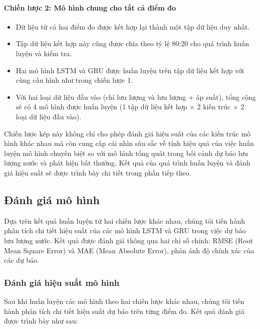 \paragraph{Chiến lược 2: Mô hình chung cho tất cả điểm đo}
\begin{itemize}
    \item Dữ liệu từ cả hai điểm đo được kết hợp lại thành một tập dữ liệu duy nhất.
    \item Tập dữ liệu kết hợp này cũng được chia theo tỷ lệ 80:20 cho quá trình huấn luyện và kiểm tra.
    \item Hai mô hình LSTM và GRU được huấn luyện trên tập dữ liệu kết hợp với cùng cấu hình như trong chiến lược 1.
    \item Với hai loại dữ liệu đầu vào (chỉ lưu lượng và lưu lượng + áp suất), tổng cộng sẽ có 4 mô hình được huấn luyện (1 tập dữ liệu kết hợp × 2 kiến trúc × 2 loại dữ liệu đầu vào).
\end{itemize}

Chiến lược kép này không chỉ cho phép đánh giá hiệu suất của các kiến trúc mô hình khác nhau mà còn cung cấp cái nhìn sâu sắc về tính hiệu quả của việc huấn luyện mô hình chuyên biệt so với mô hình tổng quát trong bối cảnh dự báo lưu lượng nước và phát hiện bất thường. Kết quả của quá trình huấn luyện và đánh giá hiệu suất sẽ được trình bày chi tiết trong phần tiếp theo.

\subsection{Đánh giá mô hình}

Dựa trên kết quả huấn luyện từ hai chiến lược khác nhau, chúng tôi tiến hành phân tích chi tiết hiệu suất của các mô hình LSTM và GRU trong việc dự báo lưu lượng nước. Kết quả được đánh giá thông qua hai chỉ số chính: RMSE (Root Mean Square Error) và MAE (Mean Absolute Error), phản ánh độ chính xác của các dự báo.

\subsubsection{Đánh giá hiệu suất mô hình}

Sau khi huấn luyện các mô hình theo hai chiến lược khác nhau, chúng tôi tiến hành phân tích chi tiết hiệu suất dự báo trên từng điểm đo. Kết quả đánh giá được trình bày như sau:

